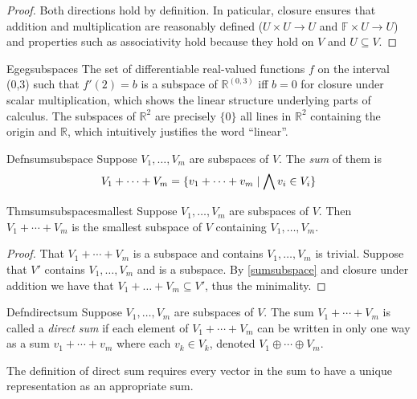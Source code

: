 \begin{proof}
  Both directions hold by definition. In paticular, closure ensures that addition and multiplication are reasonably defined ($U\times U\to U$ and $\mathbb F\times U\to U$) and properties such as associativity hold because they hold on $V$ and $U\subseteq V$.
\end{proof}

\begin{reference}{Eg}{egsubspaces}
  The set of differentiable real-valued functions $f$ on the interval (0,3) such that $f'(2)=b$ is a subspace of $\mathbb R^{(0,3)}$ iff $b=0$ for closure under scalar multiplication, which shows the linear structure underlying parts of calculus. The subspaces of $\mathbb R^2$ are precisely $\{0\}$ all lines in $\mathbb R^2$ containing the origin and $\mathbb R$, which intuitively justifies the word ``linear''.
\end{reference}


\begin{reference}{Defn}{sumsubspace}
  Suppose $V_1,\dots,V_m$ are subspaces of $V$. The \textit{sum} of them is
  \[
    V_1+\cdots+V_m=\{v_1+\cdots+v_m\mid\bigwedge v_i\in V_i\}\qedhere
  \]
\end{reference}

\begin{reference}{Thm}{sumsubspacesmallest}
  Suppose $V_1,\dots,V_m$ are subspaces of $V$. Then $V_1+\cdots+V_m$ is the smallest subspace of $V$ containing $V_1,\dots,V_m$.
\end{reference}

\begin{proof}
  That $V_1+\cdots+V_m$ is a subspace and contains $V_1,\dots,V_m$ is trivial. Suppose that $V'$ contains $V_1,\dots,V_m$ and is a subspace. By \ref{sumsubspace} and closure under addition we have that $V_1+\dots+V_m\subseteq V'$, thus the minimality.
\end{proof}

\begin{reference}{Defn}{directsum}
  Suppose $V_1,\dots,V_m$ are subspaces of $V$. The sum $V_1+\cdots+V_m$ is called a \textit{direct sum} if each element of $V_1+\cdots+V_m$ can be written in only one way as a sum $v_1+\cdots+v_m$ where each $v_k\in V_k$, denoted $V_1\oplus\cdots\oplus V_m$.
\end{reference}

The definition of direct sum requires every vector in the sum to have a unique representation as an appropriate sum.

